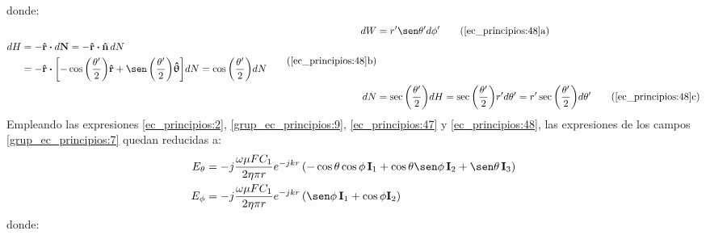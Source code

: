 donde:
\begin{align}
dW &= r'\sen\theta 'd\phi'
\tag{\ref{ec_principios:48}a}
\label{ec_principios:49}\\
\begin{split}
dH &= -\versor{r}\prodesc d\mathbf{N} = -\versor{r}\prodesc\versor{n}\,dN\\
&= -\versor{r}\prodesc\left[-\cos\left(\frac{\theta '}{2}\right)\!\versor{r} + \sen\left(\frac{\theta '}{2}\right)\!\versor{\uptheta}\right]\!dN = \cos\left(\frac{\theta '}{2}\right)\!dN
\end{split}
\tag{\ref{ec_principios:48}b}
\label{ec_principios:50}\\
dN &= \sec\left(\frac{\theta '}{2}\right)\!dH = \sec\left(\frac{\theta '}{2}\right)\!r'd\theta ' = r'\sec\left(\frac{\theta '}{2}\right)\!d\theta '
\tag{\ref{ec_principios:48}c}
\label{ec_principios:51}
\end{align}
Empleando las expresiones \eqref{ec_principios:2}, \eqref{grup_ec_principios:9}, \eqref{ec_principios:47} y \eqref{ec_principios:48}, las expresiones de los campos \eqref{grup_ec_principios:7} quedan reducidas a:
\begin{subequations}
\label{grup_ec_principios:10}
\begin{align}
E_{\theta} &= -j\frac{\omega\mu FC_1}{2\eta\pi r}e^{- jkr}\left(-\cos\theta\cos\phi\,\mathbf{I}_1 + \cos\theta\sen\phi\,\mathbf{I}_2 + \sen\theta\,\mathbf{I}_3\right)
\label{ec_principios:52}\\
E_{\phi} &= -j\frac{\omega\mu FC_1}{2\eta\pi r}e^{- jkr}\left(\sen\phi\,\mathbf{I}_1 + \cos\phi\mathbf{I}_2\right)
\label{ec_principios:53}
\end{align}
\end{subequations}
donde:
